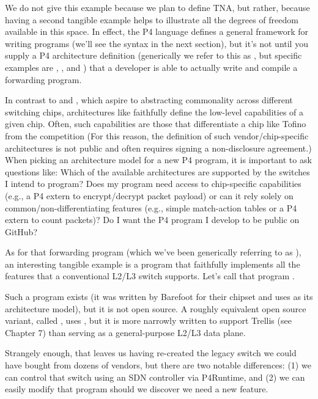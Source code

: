 \documentclass[letterpaper,11pt,english]{sphinxmanual}
\begin{document}
We do not give this example because we plan to define TNA, but rather,
because having a second tangible example helps to illustrate all the
degrees of freedom available in this space. In effect, the P4 language
defines a general framework for writing programs (we’ll see the syntax
in the next section), but it’s not until you supply a P4 architecture
definition (generically we refer to this as , but specific
examples are , , and ) that a
developer is able to actually write and compile a forwarding program.

In contrast to  and , which aspire to
abstracting commonality across different switching chips,
architectures like  faithfully define the low-level
capabilities of a given chip. Often, such capabilities are those that
differentiate a chip like Tofino from the competition (For this
reason, the definition of such vendor/chip-specific architectures is
not public and often requires signing a non-disclosure agreement.)
When picking an architecture model for a new P4 program, it is
important to ask questions like: Which of the available architectures
are supported by the switches I intend to program? Does my program
need access to chip-specific capabilities (e.g., a P4 extern to
encrypt/decrypt packet payload) or can it rely solely on
common/non-differentiating features (e.g., simple match-action tables
or a P4 extern to count packets)? Do I want the P4 program I develop
to be public on GitHub?

As for that forwarding program (which we’ve been generically referring
to as ), an interesting tangible example is a program
that faithfully implements all the features that a conventional L2/L3
switch supports. Let’s call that program .%
\begin{footnote}[2]\sphinxAtStartFootnote
Such a program exists (it was written by Barefoot for their
chipset and uses  as its architecture model), but it
is not open source. A roughly equivalent open source variant,
called , uses , but it is more
narrowly written to support Trellis (see Chapter 7) than
serving as a general-purpose L2/L3 data plane.
%
\end{footnote} Strangely
enough, that leaves us having re-created the legacy switch we could
have bought from dozens of vendors, but there are two notable
differences: (1) we can control that switch using an SDN controller
via P4Runtime, and (2) we can easily modify that program should we
discover we need a new feature.
\end{document}
